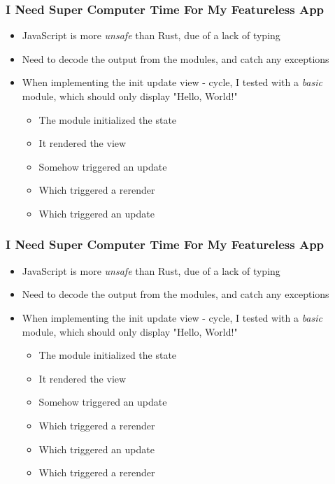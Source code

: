 \begin{frame}
  \frametitle{I Need Super Computer Time For My Featureless App}
  \begin{itemize}
    \item JavaScript is more \textit{unsafe} than Rust, due of a lack of typing
    \item Need to decode the output from the modules, and catch any exceptions
    \item When implementing the init \to update \to view - cycle, I tested with
      a \textit{basic} module, which should only display "Hello, World!"
      \begin{itemize}
        \item The module initialized the state
        \item It rendered the view
        \item Somehow triggered an update
        \item Which triggered a rerender
        \item Which triggered an update
      \end{itemize}
  \end{itemize}
\end{frame}

\begin{frame}
  \frametitle{I Need Super Computer Time For My Featureless App}
  \begin{itemize}
    \item JavaScript is more \textit{unsafe} than Rust, due of a lack of typing
    \item Need to decode the output from the modules, and catch any exceptions
    \item When implementing the init \to update \to view - cycle, I tested with
      a \textit{basic} module, which should only display "Hello, World!"
      \begin{itemize}
        \item The module initialized the state
        \item It rendered the view
        \item Somehow triggered an update
        \item Which triggered a rerender
        \item Which triggered an update
        \item Which triggered a rerender
      \end{itemize}
  \end{itemize}
\end{frame}

